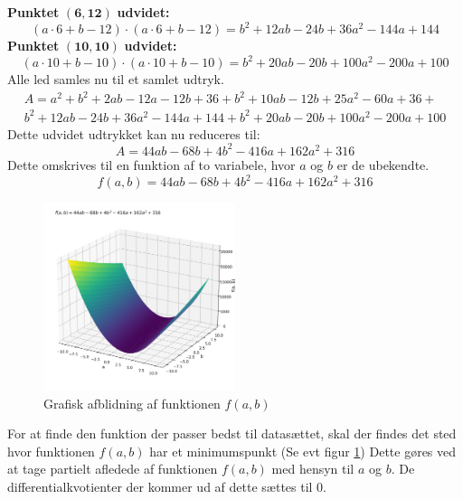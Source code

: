 \textbf{Punktet}   $\mathbf{(6,12)}$ \textbf{udvidet:}
\begin{equation*}
    (a \cdot 6 + b - 12) \cdot (a \cdot 6 + b - 12) = b^2 + 12ab - 24b + 36a^2 - 144a + 144
\end{equation*}
\textbf{Punktet}   $\mathbf{(10,10)}$ \textbf{udvidet:}
\begin{equation*}
    (a \cdot 10 + b - 10) \cdot (a \cdot 10 + b - 10) = b^2 + 20ab - 20b + 100a^2 - 200a + 100
\end{equation*}
Alle led samles nu til et samlet udtryk. 
\begin{equation*}
    \begin{split}
    A = a^2 + b^2 + 2ab - 12a - 12b + 36 + b^2 + 10ab -12b + 25a^2 - 60a + 36 + \\ b^2 + 12ab - 24b + 36a^2 - 144a + 144 + b^2 + 20ab - 20b + 100a^2 - 200a + 100
\end{split}
\end{equation*}
Dette udvidet udtrykket kan nu reduceres til:
\begin{equation*}
    A = 44ab - 68b + 4b^2 - 416a + 162a^2 + 316
\end{equation*}
Dette omskrives til en funktion af to variabele, hvor $a$ og $b$ er de ubekendte. 
\begin{equation*}
   f(a,b) = 44ab - 68b + 4b^2 - 416a + 162a^2 + 316 
\end{equation*}
\begin{figure}[h!]
    \centering
    \includegraphics[width=0.5\textwidth]{figures/3dGraf.png}
    \caption{Grafisk afblidning af funktionen $f(a,b)$}
    \label{fig:grafiskAfbildningAfFunktionAfToVariable}
\end{figure}  
For at finde den funktion der passer bedst til datasættet, skal der findes det sted hvor funktionen $f(a,b)$ har et minimumspunkt (Se evt figur \ref{fig:grafiskAfbildningAfFunktionAfToVariable}) Dette gøres ved at tage partielt afledede af funktionen $f(a,b)$ med hensyn til $a$ og $b$. De differentialkvotienter der kommer ud af dette sættes til 0. 
